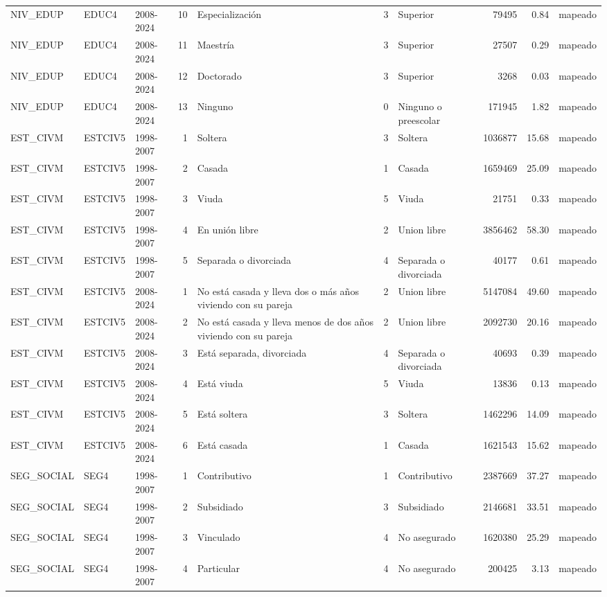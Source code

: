 \begin{tabular}{lllrlllrrl}
NIV\_EDUP & EDUC4 & 2008-2024 & 10 & Especialización & 3 & Superior & 79495 & 0.84 & mapeado \\
NIV\_EDUP & EDUC4 & 2008-2024 & 11 & Maestría & 3 & Superior & 27507 & 0.29 & mapeado \\
NIV\_EDUP & EDUC4 & 2008-2024 & 12 & Doctorado & 3 & Superior & 3268 & 0.03 & mapeado \\
NIV\_EDUP & EDUC4 & 2008-2024 & 13 & Ninguno & 0 & Ninguno o preescolar & 171945 & 1.82 & mapeado \\
EST\_CIVM & ESTCIV5 & 1998-2007 & 1 & Soltera & 3 & Soltera & 1036877 & 15.68 & mapeado \\
EST\_CIVM & ESTCIV5 & 1998-2007 & 2 & Casada & 1 & Casada & 1659469 & 25.09 & mapeado \\
EST\_CIVM & ESTCIV5 & 1998-2007 & 3 & Viuda & 5 & Viuda & 21751 & 0.33 & mapeado \\
EST\_CIVM & ESTCIV5 & 1998-2007 & 4 & En unión libre & 2 & Union libre & 3856462 & 58.30 & mapeado \\
EST\_CIVM & ESTCIV5 & 1998-2007 & 5 & Separada o divorciada & 4 & Separada o divorciada & 40177 & 0.61 & mapeado \\
EST\_CIVM & ESTCIV5 & 2008-2024 & 1 & No está casada y lleva dos o más años viviendo con su pareja & 2 & Union libre & 5147084 & 49.60 & mapeado \\
EST\_CIVM & ESTCIV5 & 2008-2024 & 2 & No está casada y lleva menos de dos años viviendo con su pareja & 2 & Union libre & 2092730 & 20.16 & mapeado \\
EST\_CIVM & ESTCIV5 & 2008-2024 & 3 & Está separada, divorciada & 4 & Separada o divorciada & 40693 & 0.39 & mapeado \\
EST\_CIVM & ESTCIV5 & 2008-2024 & 4 & Está viuda & 5 & Viuda & 13836 & 0.13 & mapeado \\
EST\_CIVM & ESTCIV5 & 2008-2024 & 5 & Está soltera & 3 & Soltera & 1462296 & 14.09 & mapeado \\
EST\_CIVM & ESTCIV5 & 2008-2024 & 6 & Está casada & 1 & Casada & 1621543 & 15.62 & mapeado \\
SEG\_SOCIAL & SEG4 & 1998-2007 & 1 & Contributivo & 1 & Contributivo & 2387669 & 37.27 & mapeado \\
SEG\_SOCIAL & SEG4 & 1998-2007 & 2 & Subsidiado & 3 & Subsidiado & 2146681 & 33.51 & mapeado \\
SEG\_SOCIAL & SEG4 & 1998-2007 & 3 & Vinculado & 4 & No asegurado & 1620380 & 25.29 & mapeado \\
SEG\_SOCIAL & SEG4 & 1998-2007 & 4 & Particular & 4 & No asegurado & 200425 & 3.13 & mapeado \\

\end{tabular}
